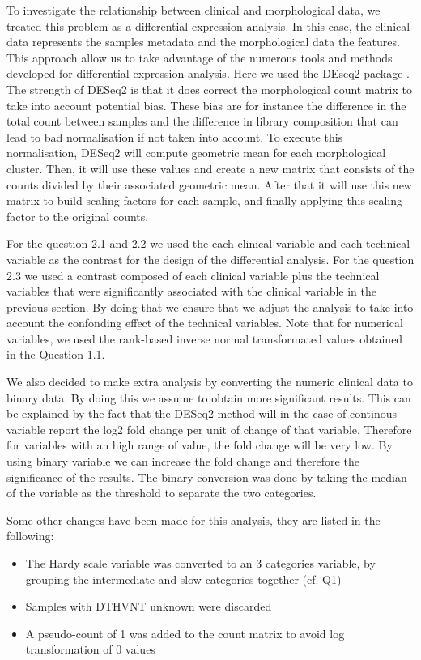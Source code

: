 \documentclass[a4paper, 11pt]{article}
\begin{document}
\begin{multicols}{2}
To investigate the relationship between clinical and morphological data, we treated this problem as a differential expression analysis. 
In this case, the clinical data represents the samples metadata and the morphological data the features. 
This approach allow us to take advantage of the numerous tools and methods developed for differential expression analysis.
Here we used the DEseq2 package \citep{DESeq2:2014}. The strength of DESeq2 is that it does correct the morphological count matrix to take into account potential bias. 
These bias are for instance the difference in the total count between samples and the difference in library composition that can lead to bad normalisation if not taken into account. 
To execute this normalisation, DESeq2 will compute geometric mean for each morphological cluster. 
Then, it will use these values and create a new matrix that consists of the counts divided by their associated geometric mean. 
After that it will use this new matrix to build scaling factors for each sample, and finally applying this scaling factor to the original counts.

For the question 2.1 and 2.2 we used the each clinical variable and each technical variable as the contrast for the design of the differential analysis.
For the question 2.3 we used a contrast composed of each clinical variable plus the technical variables that were significantly associated with the clinical variable in the previous section.
By doing that we ensure that we adjust the analysis to take into account the confonding effect of the technical variables.
Note that for numerical variables, we used the rank-based inverse normal transformated values obtained in the Question 1.1.

We also decided to make extra analysis by converting the numeric clinical data to binary data. By doing this we assume to obtain more significant results. 
This can be explained by the fact that the DESeq2 method will in the case of continous variable report the log2 fold change per unit of change of that variable.
Therefore for variables with an high range of value, the fold change will be very low. By using binary variable we can increase the fold change and therefore the significance of the results.
The binary conversion was done by taking the median of the variable as the threshold to separate the two categories.

Some other changes have been made for this analysis, they are listed in the following:
\begin{itemize}
	\item  The Hardy scale variable was converted to an 3 categories variable, by grouping the intermediate and slow categories together (cf. Q1)
	\item  Samples with DTHVNT unknown were discarded
	\item  A pseudo-count of 1 was added to the count matrix to avoid log transformation of 0 values
\end{itemize}



\end{multicols}
\end{document}
